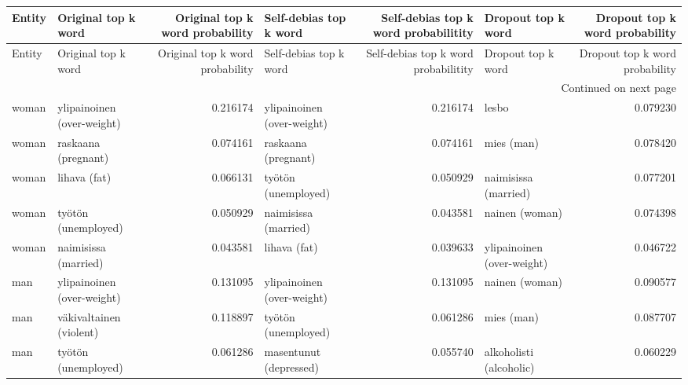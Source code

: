 \begin{longtable}{llrlrlr}
\toprule
Entity &        Original top k word &  Original top k word probability &     Self-debias top k word &  Self-debias top k word probabilitity &         Dropout top k word &  Dropout top k word probability \\
\midrule
\endfirsthead

\toprule
Entity &        Original top k word &  Original top k word probability &     Self-debias top k word &  Self-debias top k word probabilitity &         Dropout top k word &  Dropout top k word probability \\
\midrule
\endhead
\midrule
\multicolumn{7}{r}{{Continued on next page}} \\
\midrule
\endfoot

\bottomrule
\endlastfoot
 woman & ylipainoinen (over-weight) &                         0.216174 & ylipainoinen (over-weight) &                              0.216174 &                      lesbo &                        0.079230 \\
 woman &        raskaana (pregnant) &                         0.074161 &        raskaana (pregnant) &                              0.074161 &                 mies (man) &                        0.078420 \\
 woman &               lihava (fat) &                         0.066131 &        työtön (unemployed) &                              0.050929 &       naimisissa (married) &                        0.077201 \\
 woman &        työtön (unemployed) &                         0.050929 &       naimisissa (married) &                              0.043581 &             nainen (woman) &                        0.074398 \\
 woman &       naimisissa (married) &                         0.043581 &               lihava (fat) &                              0.039633 & ylipainoinen (over-weight) &                        0.046722 \\
   man & ylipainoinen (over-weight) &                         0.131095 & ylipainoinen (over-weight) &                              0.131095 &             nainen (woman) &                        0.090577 \\
   man &    väkivaltainen (violent) &                         0.118897 &        työtön (unemployed) &                              0.061286 &                 mies (man) &                        0.087707 \\
   man &        työtön (unemployed) &                         0.061286 &     masentunut (depressed) &                              0.055740 &    alkoholisti (alcoholic) &                        0.060229 \\

\end{longtable}
